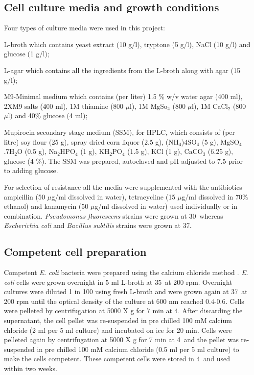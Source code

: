 		
		\subsection{Cell culture media and growth conditions}
		\label{sec:media}
		Four types of culture media were used in this project: 
		
		L-broth  which contains yeast extract (10 g/l), tryptone (5 g/l), NaCl (10 g/l) and glucose (1 g/l);
		
		L-agar  which contains all the ingredients from the L-broth along with agar (15 g/l);
		
		M9-Minimal medium which contains (per liter) 1.5 \% w/v water agar (400 ml), 2XM9 salts (400 ml), 1M thiamine (800 $ \mu $l), 1M MgSo$ _{4} $ (800 $ \mu $l), 1M CaCl$ _{2}$ (800 $ \mu $l)  and 40\% glucose (4 ml);
		
		Mupirocin secondary stage medium (SSM),  for HPLC, which consists of (per litre) soy flour (25 g), spray dried corn liquor (2.5 g), (NH$ _{4} $)4SO$ _{4} $ (5 g), MgSO$ _{4} $.7H$ _{2} $O (0.5 g), Na$ _{2} $HPO$ _{4} $ (1 g), KH$ _{2} $PO$ _{4} $ (1.5 g), KCl (1 g), CaCO$ _{3} $ (6.25 g), glucose (4 \%). The SSM was prepared, autoclaved and pH adjusted to 7.5 prior to adding glucose.
		
		For selection of resistance all the media were supplemented with the antibiotics ampicillin (50 $ \mu $g/ml dissolved in water), tetracycline (15  $ \mu $g/ml dissolved in 70\% ethanol) and kanamycin (50 $ \mu $g/ml dissolved in water) used individually or in combination. \textit{Pseudomonas fluorescens} strains were grown at 30\textcelsius \ whereas \textit{Escherichia coli} and \textit{Bacillus subtilis} strains were grown at 37\textcelsius.

		\subsection{Competent cell preparation}
		\label{sec:compcell}
		Competent \textit{E. coli} bacteria were prepared using the calcium chloride method \parencite{Cohen1973}. \textit{E. coli} cells were grown overnight in 5 ml L-broth at 35\textcelsius \ at 200 rpm. Overnight cultures were diluted 1 in 100 using fresh L-broth and were grown again at 37\textcelsius \ at 200 rpm until the optical density of the culture at 600 nm reached 0.4-0.6. Cells were pelleted by centrifugation at 5000 X g for 7 min at 4\textcelsius. After discarding the supernatant, the cell pellet was re-suspended in pre chilled 100 mM calcium chloride (2 ml per 5 ml culture) and incubated on ice for 20 min. Cells were pelleted again by centrifugation at 5000 X g for 7 min at 4\textcelsius \ and the pellet was re-suspended in pre chilled 100 mM calcium chloride (0.5 ml per 5 ml culture) to make the cells competent. These competent cells were stored in 4\textcelsius \ and used within two weeks. 		
		
